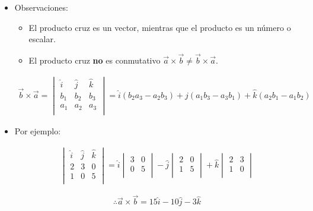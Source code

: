 \begin{itemize}
    \item Observaciones:
        \begin{itemize}
            \item El producto cruz es un vector, mientras que el producto es un número o escalar.
            \item El producto cruz \textbf{no} es conmutativo $\vec{a}\times \vec{b} \neq \vec{b}\times \vec{a}$.
        \end{itemize}
        \begin{center}
            \begin{align*}
                \vec{b}\times \vec{a} = \begin{vmatrix}
                    \hat{i} & \hat{j} & \hat{k} \\ 
                    b_1 & b_2 & b_3 \\ 
                    a_1 & a_2 & a_3 \\ 
                \end{vmatrix} = \hat{i}(b_2a_3-a_2b_3)+\hat{j}(a_1b_3-a_3b_1)+\hat{k}(a_2b_1-a_1b_2)
            \end{align*}
        \end{center}
    
    \item Por ejemplo:
        \begin{center}
            \begin{align*}
                \begin{vmatrix}
                    \hat{i} & \hat{j} & \hat{k} \\ 
                    2 & 3 & 0 \\ 
                    1 & 0 & 5 \\ 
                \end{vmatrix} = \hat{i}\begin{vmatrix}
                    3 & 0 \\ 
                    0 & 5 \\ 
                \end{vmatrix} - \hat{j}\begin{vmatrix}
                    2 & 0 \\ 
                    1 & 5 \\ 
                \end{vmatrix} + \hat{k} \begin{vmatrix}
                    2 & 3 \\ 
                    1 & 0 \\ 
                \end{vmatrix}
            \end{align*}
        \end{center}
        \[
          \therefore \vec{a}\times \vec{b} = 15\hat{i}-10\hat{j}-3\hat{k}
        \]
    

\end{itemize}
